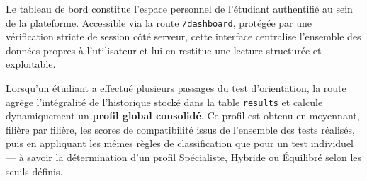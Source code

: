 \documentclass[a4paper,12pt]{article}
\begin{document}
Le tableau de bord constitue l'espace personnel de l'étudiant authentifié au sein de la plateforme. Accessible via la route \texttt{/dashboard}, protégée par une vérification stricte de session côté serveur, cette interface centralise l'ensemble des données propres à l'utilisateur et lui en restitue une lecture structurée et exploitable.

Lorsqu'un étudiant a effectué plusieurs passages du test d'orientation, la route agrège l'intégralité de l'historique stocké dans la table \texttt{results} et calcule dynamiquement un \textbf{profil global consolidé}. Ce profil est obtenu en moyennant, filière par filière, les scores de compatibilité issus de l'ensemble des tests réalisés, puis en appliquant les mêmes règles de classification que pour un test individuel --- à savoir la détermination d'un profil Spécialiste, Hybride ou Équilibré selon les seuils définis. 
\end{document}
